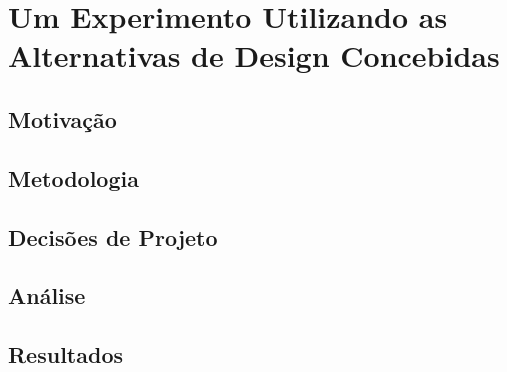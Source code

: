 \chapter{Um Experimento Utilizando as Alternativas de Design Concebidas}

\section{Motivação}
\section{Metodologia}
\section{Decisões de Projeto}
\section{Análise}
\section{Resultados}